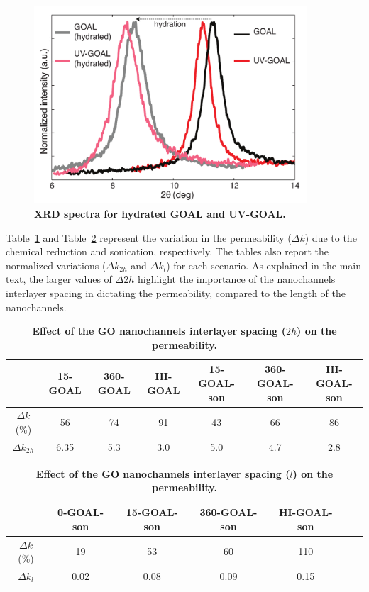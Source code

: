 \begin{figure}[h!]
  \centering
  \includegraphics[width=4in]{paper4/FigS10.pdf}
  \caption{\textbf{XRD spectra for hydrated GOAL and UV-GOAL.}} 
  \label{figS10_AppC}
\end{figure}

Table~\ref{tblS3_AppC} and Table~\ref{tblS4_AppC} represent the variation in the permeability ($\Delta k$) due to the chemical reduction and sonication, respectively. The tables also report the normalized variations ($\Delta k_{2h}$ and $\Delta k_{l}$) for each scenario. As explained in the main text, the larger values of $\Delta 2h$ highlight the importance of the nanochannels interlayer spacing in dictating the permeability, compared to the length of the nanochannels. 

\begin{table}
 \begin{center}
 \caption{\textbf{Effect of the GO nanochannels interlayer spacing ($2h$) on the permeability.}}
  \label{tblS3_AppC}
  \begin{tabular}{*7c}
     &15-GOAL&360-GOAL&HI-GOAL&15-GOAL-son&360-GOAL-son&HI-GOAL-son\\
    \hline
    $\Delta k$ (\%)  & 56 &74& 91 &43 &66 &86\\
    $\Delta k_{2h}$& 6.35& 5.3 &3.0& 5.0& 4.7& 2.8 \\
    \hline
  \end{tabular}
 \end{center}
\end{table}


\begin{table}
 \begin{center}
 \caption{\textbf{Effect of the GO nanochannels interlayer spacing ($l$) on the permeability.}}
  \label{tblS4_AppC}
  \begin{tabular}{*7c}
    {}&0-GOAL-son&15-GOAL-son&360-GOAL-son&HI-GOAL-son\\
    \hline
    $\Delta k$ (\%) & 19 &53& 60 & 110\\
    $\Delta k_{l}$& 0.02& 0.08 &0.09& 0.15 \\
    \hline
  \end{tabular}
 \end{center}
\end{table}

